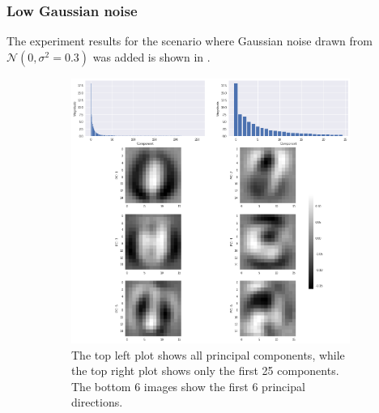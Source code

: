 \documentclass[a4paper,11pt]{article}
\begin{document}
\subsubsection*{Low Gaussian noise}

The experiment results for the scenario where Gaussian noise drawn from $\mathcal{N}(0, \sigma^2=0.3)$ was added is shown in .

\begin{figure}
	\centering
	\begin{subfigure}[t]{0.45\textwidth}
		\includegraphics[width=\textwidth]{images/assignment5-3-lgn1.png}
		\caption{The top left plot shows all principal components, while the top right plot shows only the first 25 components. The bottom 6 images show the first 6 principal directions.}
		\label{fig:assignment5-3-lgn1}
	\end{subfigure}
	\hfill
	\begin{subfigure}[t]{0.45\textwidth}

\end{subfigure}
\end{figure}
\end{document}
